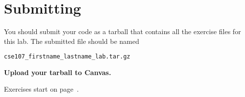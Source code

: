 \section*{Submitting}\label{submitting}

You should submit your code as a tarball that contains all the
exercise files for this lab. The submitted file should be named
\begin{center}
  \texttt{cse107\_firstname\_lastname\_lab\thelabnumber.tar.gz}
\end{center}

\begin{center}
  \textbf{Upload your tarball to Canvas.}
\end{center}

\listofexercises

Exercises start on page~\pageref{exercises}.